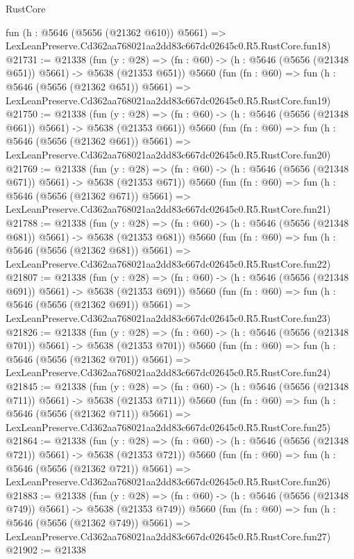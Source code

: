 \begin{lexlean}{RustCore}
\begin{coremodule}
    fun (h : @5646 (@5656 (@21362 @610)) @5661) =>
    LexLeanPreserve.Cd362aa768021aa2dd83c667dc02645c0.R5.RustCore.fun18)
@21731 := @21338
    (fun (y : @28) => (fn : @60) -> (h : @5646 (@5656 (@21348 @651)) @5661) -> @5638 (@21353 @651))
    @5660
    (fun (fn : @60) =>
    fun (h : @5646 (@5656 (@21362 @651)) @5661) =>
    LexLeanPreserve.Cd362aa768021aa2dd83c667dc02645c0.R5.RustCore.fun19)
@21750 := @21338
    (fun (y : @28) => (fn : @60) -> (h : @5646 (@5656 (@21348 @661)) @5661) -> @5638 (@21353 @661))
    @5660
    (fun (fn : @60) =>
    fun (h : @5646 (@5656 (@21362 @661)) @5661) =>
    LexLeanPreserve.Cd362aa768021aa2dd83c667dc02645c0.R5.RustCore.fun20)
@21769 := @21338
    (fun (y : @28) => (fn : @60) -> (h : @5646 (@5656 (@21348 @671)) @5661) -> @5638 (@21353 @671))
    @5660
    (fun (fn : @60) =>
    fun (h : @5646 (@5656 (@21362 @671)) @5661) =>
    LexLeanPreserve.Cd362aa768021aa2dd83c667dc02645c0.R5.RustCore.fun21)
@21788 := @21338
    (fun (y : @28) => (fn : @60) -> (h : @5646 (@5656 (@21348 @681)) @5661) -> @5638 (@21353 @681))
    @5660
    (fun (fn : @60) =>
    fun (h : @5646 (@5656 (@21362 @681)) @5661) =>
    LexLeanPreserve.Cd362aa768021aa2dd83c667dc02645c0.R5.RustCore.fun22)
@21807 := @21338
    (fun (y : @28) => (fn : @60) -> (h : @5646 (@5656 (@21348 @691)) @5661) -> @5638 (@21353 @691))
    @5660
    (fun (fn : @60) =>
    fun (h : @5646 (@5656 (@21362 @691)) @5661) =>
    LexLeanPreserve.Cd362aa768021aa2dd83c667dc02645c0.R5.RustCore.fun23)
@21826 := @21338
    (fun (y : @28) => (fn : @60) -> (h : @5646 (@5656 (@21348 @701)) @5661) -> @5638 (@21353 @701))
    @5660
    (fun (fn : @60) =>
    fun (h : @5646 (@5656 (@21362 @701)) @5661) =>
    LexLeanPreserve.Cd362aa768021aa2dd83c667dc02645c0.R5.RustCore.fun24)
@21845 := @21338
    (fun (y : @28) => (fn : @60) -> (h : @5646 (@5656 (@21348 @711)) @5661) -> @5638 (@21353 @711))
    @5660
    (fun (fn : @60) =>
    fun (h : @5646 (@5656 (@21362 @711)) @5661) =>
    LexLeanPreserve.Cd362aa768021aa2dd83c667dc02645c0.R5.RustCore.fun25)
@21864 := @21338
    (fun (y : @28) => (fn : @60) -> (h : @5646 (@5656 (@21348 @721)) @5661) -> @5638 (@21353 @721))
    @5660
    (fun (fn : @60) =>
    fun (h : @5646 (@5656 (@21362 @721)) @5661) =>
    LexLeanPreserve.Cd362aa768021aa2dd83c667dc02645c0.R5.RustCore.fun26)
@21883 := @21338
    (fun (y : @28) => (fn : @60) -> (h : @5646 (@5656 (@21348 @749)) @5661) -> @5638 (@21353 @749))
    @5660
    (fun (fn : @60) =>
    fun (h : @5646 (@5656 (@21362 @749)) @5661) =>
    LexLeanPreserve.Cd362aa768021aa2dd83c667dc02645c0.R5.RustCore.fun27)
@21902 := @21338

\end{coremodule}
\end{lexlean}
